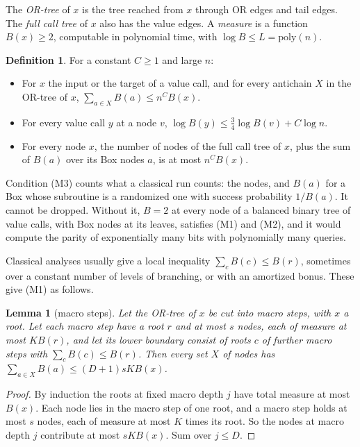 \documentclass[11pt]{article}
\newtheorem{lemma}[theorem]{Lemma}
\theoremstyle{definition}
\newtheorem{definition}[theorem]{Definition}
\theoremstyle{remark}
\newcommand{\poly}{\mathrm{poly}}
\begin{document}
The \emph{OR-tree} of $x$ is the tree reached from $x$ through OR edges and tail edges. The \emph{full call tree} of $x$ also has the value edges. A \emph{measure} is a function $B(x)\ge2$, computable in polynomial time, with $\log B\le L=\poly(n)$.

\begin{definition}\label{def:conditions}
For a constant $C\ge1$ and large $n$:
\begin{itemize}[leftmargin=2.5em]
\item[(M1)] For $x$ the input or the target of a value call, and for every antichain $X$ in the OR-tree of $x$, $\sum_{a\in X}B(a)\le n^CB(x)$.
\item[(M2)] For every value call $y$ at a node $v$, $\log B(y)\le\frac34\log B(v)+C\log n$.
\item[(M3)] For every node $x$, the number of nodes of the full call tree of $x$, plus the sum of $B(a)$ over its Box nodes $a$, is at most $n^CB(x)$.
\end{itemize}
\end{definition}

Condition (M3) counts what a classical run counts: the nodes, and $B(a)$ for a Box whose subroutine is a randomized one with success probability $1/B(a)$. It cannot be dropped. Without it, $B=2$ at every node of a balanced binary tree of value calls, with Box nodes at its leaves, satisfies (M1) and (M2), and it would compute the parity of exponentially many bits with polynomially many queries.

Classical analyses usually give a local inequality $\sum_cB(c)\le B(r)$, sometimes over a constant number of levels of branching, or with an amortized bonus. These give (M1) as follows.

\begin{lemma}[macro steps]\label{lem:macro}
Let the OR-tree of $x$ be cut into macro steps, with $x$ a root. Let each macro step have a root $r$ and at most $s$ nodes, each of measure at most $KB(r)$, and let its lower boundary consist of roots $c$ of further macro steps with $\sum_cB(c)\le B(r)$. Then every set $X$ of nodes has $\sum_{a\in X}B(a)\le(D+1)sKB(x)$.
\end{lemma}

\begin{proof}
By induction the roots at fixed macro depth $j$ have total measure at most $B(x)$. Each node lies in the macro step of one root, and a macro step holds at most $s$ nodes, each of measure at most $K$ times its root. So the nodes at macro depth $j$ contribute at most $sKB(x)$. Sum over $j\le D$. \end{proof}
\end{document}
